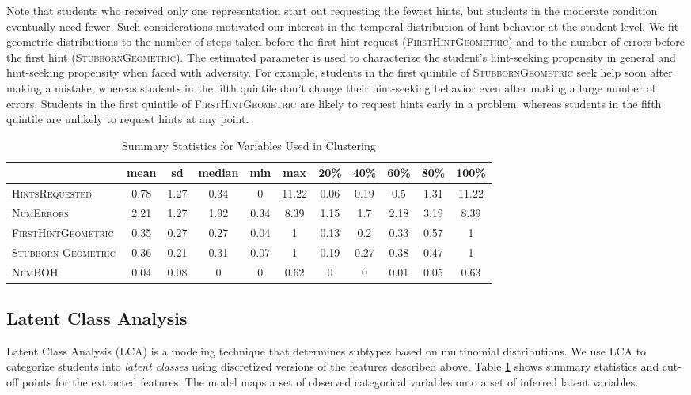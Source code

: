 \documentclass{edm_template}
\newcommand{\ftr}[1]{\textsc{#1}}
\begin{document}
Note that students who received only one representation start out requesting the fewest hints, but students in the moderate condition eventually need fewer. Such considerations motivated our interest in the temporal distribution of hint behavior at the student level. We fit geometric distributions to the number of steps taken before the first hint request (\ftr{FirstHintGeometric}) and to the number of errors before the first hint (\ftr{StubbornGeometric}). The estimated parameter is used to characterize the student's hint-seeking propensity in general and hint-seeking propensity when faced with adversity. For example, students in the first quintile of \ftr{StubbornGeometric} seek help soon after making a mistake, whereas students in the fifth quintile don't change their hint-seeking behavior even after making a large number of errors. Students in the first quintile of \ftr{FirstHintGeometric} are likely to request hints early in a problem, whereas students in the fifth quintile are unlikely to request hints at any point.
\begin{table}[htbp]
\caption{Summary Statistics for Variables Used in Clustering}
\begin{center}
\begin{tabular}{| l || c | c || c | c | c || c | c | c | c | c |}
\hline
&mean& sd&median&min&max&20\%&40\%&60\%&	80\%&100\%\\ \hline \hline
\ftr{HintsRequested}&0.78&1.27&0.34&0&11.22&0.06&0.19&0.5&1.31&11.22\\ \hline
\ftr{NumErrors}&2.21&1.27&1.92&0.34&8.39&1.15&1.7&2.18&3.19&8.39\\ \hline 
\ftr{FirstHintGeometric}&0.35&0.27&0.27&0.04&1&0.13&0.2&0.33&0.57&1\\ \hline
\ftr{Stubborn Geometric}&0.36&0.21&0.31&0.07&1&0.19&0.27&0.38&0.47&1\\ \hline
\ftr{NumBOH}&0.04&0.08&0&0&0.62&0&0&0.01&0.05&0.63\\ \hline
 \end{tabular}
\end{center}
\label{tab:sumstats}
\end{table}

\subsection{Latent Class Analysis}
\label{sec:LCA}

Latent Class Analysis (LCA) is a modeling technique that determines subtypes based on multinomial distributions. We use LCA to categorize students into \emph{latent classes} using discretized versions of the features described above. Table \ref{tab:sumstats} shows summary statistics and cut-off points for the extracted features. The model maps a set of observed categorical variables onto a set of inferred latent variables. 
\end{document}
